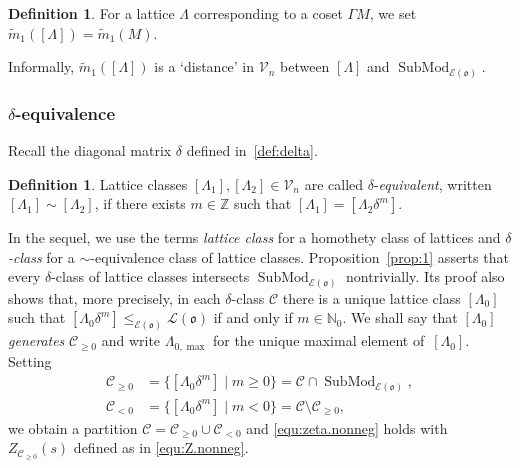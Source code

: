 \documentclass[11pt]{amsart}
\numberwithin{equation}{section}
\numberwithin{figure}{section}
\theoremstyle{plain}
\theoremstyle{definition}
\newtheorem{definition}[theorem]{Definition}
\theoremstyle{remark}
\begin{document}
\begin{definition}\label{def:dist}
  For a lattice $\Lambda$ corresponding to a coset $\Gamma M$, we set
  ${\ensuremath{\widetilde{m}}}_1([\Lambda]) = {\ensuremath{\widetilde{m}}}_1(M)$.
\end{definition}

Informally, ${\ensuremath{\widetilde{m}}}_1([\Lambda])$ is a `distance' in ${\ensuremath{\mathcal{V}}}_n$ between
$[\Lambda]$ and $\operatorname{SubMod}_{{\mathcal{E}}({\mathfrak o})}$.

\subsubsection{$\delta$-equivalence}
Recall the diagonal matrix $\delta$ defined in~\eqref{def:delta}.

\begin{definition}\label{def:equiv}
  Lattice classes $[\Lambda_1],[\Lambda_2]\in {\ensuremath{\mathcal{V}}}_n$ are called
  $\delta$-\emph{equivalent}, written $[\Lambda_1]\sim[\Lambda_2]$, if
  there exists $m\in{\ensuremath{\mathbb{Z}}}$ such that $[\Lambda_1] = [\Lambda_2
    \delta^m]$.
\end{definition}

In the sequel, we use the terms \emph{lattice class} for a homothety
class of lattices and \emph{$\delta$-class} for a $\sim$-equivalence
class of lattice classes.  Proposition~\ref{prop:1} asserts that every
$\delta$-class of lattice classes intersects $\operatorname{SubMod}_{{\mathcal{E}}({\mathfrak o})}$
nontrivially. Its proof also shows that, more precisely, in each
$\delta$-class ${{\mathcal{C}}}$ there is a unique lattice class $[\Lambda_0]$
such that $[\Lambda_0\delta^m] \leq_{{\mathcal{E}}({\mathfrak o})} {\ensuremath{\mathcal{L}}}({\mathfrak o})$ if and
only if $m\in{\ensuremath{\mathbb{N}}}_0$. We shall say that $[\Lambda_0]$ \emph{generates}
${{\mathcal{C}}}_{\geq 0}$ and write $\Lambda_{0,\max}$ for the unique maximal
element of~$[\Lambda_0]$. Setting
\begin{align*}
  {{\mathcal{C}}}_{\geq0} & = \{[\Lambda_0 \delta^m] \mid m\geq 0\} = {{\mathcal{C}}} \cap
  \operatorname{SubMod}_{{\mathcal{E}}({\mathfrak o})}, \\
  {{\mathcal{C}}}_{<0} & = \{ [\Lambda_0 \delta^m] \mid m < 0\}= {{\mathcal{C}}} \setminus
  {{\mathcal{C}}}_{\geq0},
\end{align*} we obtain a partition ${{\mathcal{C}}} = {{\mathcal{C}}}_{\geq 0} \cup
{{\mathcal{C}}}_{<0}$ and \eqref{equ:zeta.nonneg} holds with
$Z_{{{\mathcal{C}}}_{\geq0}}(s)$ defined as in \eqref{equ:Z.nonneg}.
\end{document}
